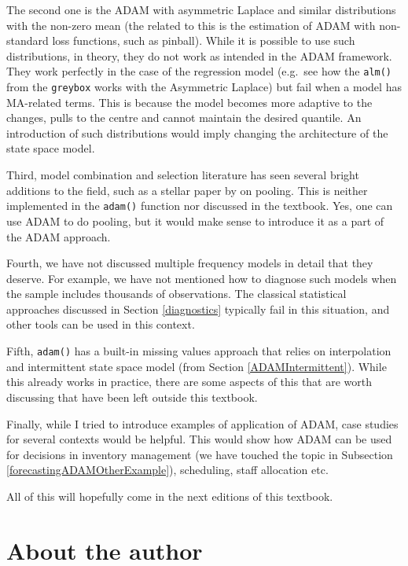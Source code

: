\documentclass[
]{book}
\theoremstyle{definition}
\theoremstyle{definition}
\theoremstyle{definition}
\theoremstyle{definition}
\theoremstyle{remark}
\begin{document}
The second one is the ADAM with asymmetric Laplace and similar distributions with the non-zero mean (the related to this is the estimation of ADAM with non-standard loss functions, such as pinball). While it is possible to use such distributions, in theory, they do not work as intended in the ADAM framework. They work perfectly in the case of the regression model (e.g.~see how the \texttt{alm()} from the \texttt{greybox} works with the Asymmetric Laplace) but fail when a model has MA-related terms. This is because the model becomes more adaptive to the changes, pulls to the centre and cannot maintain the desired quantile. An introduction of such distributions would imply changing the architecture of the state space model.

Third, model combination and selection literature has seen several bright additions to the field, such as a stellar paper by \citet{Kourentzes2019c} on pooling. This is neither implemented in the \texttt{adam()} function nor discussed in the textbook. Yes, one can use ADAM to do pooling, but it would make sense to introduce it as a part of the ADAM approach.

Fourth, we have not discussed multiple frequency models in detail that they deserve. For example, we have not mentioned how to diagnose such models when the sample includes thousands of observations. The classical statistical approaches discussed in Section \ref{diagnostics} typically fail in this situation, and other tools can be used in this context.

Fifth, \texttt{adam()} has a built-in missing values approach that relies on interpolation and intermittent state space model (from Section \ref{ADAMIntermittent}). While this already works in practice, there are some aspects of this that are worth discussing that have been left outside this textbook.

Finally, while I tried to introduce examples of application of ADAM, case studies for several contexts would be helpful. This would show how ADAM can be used for decisions in inventory management (we have touched the topic in Subsection \ref{forecastingADAMOtherExample}), scheduling, staff allocation etc.

All of this will hopefully come in the next editions of this textbook.

\hypertarget{about-the-author}{%
\chapter*{About the author}\label{about-the-author}}
\end{document}
